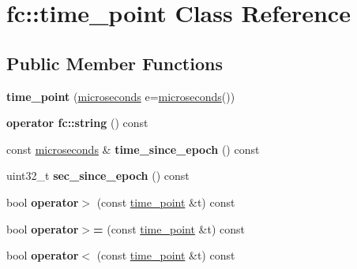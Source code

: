 \hypertarget{classfc_1_1time__point}{}\section{fc\+:\+:time\+\_\+point Class Reference}
\label{classfc_1_1time__point}
\subsection*{Public Member Functions}
\begin{DoxyCompactItemize}
\item 
\mbox{\label{classfc_1_1time__point_ada7b7d3ad6a93247eb2da29f193d0a3f}} 
{\bfseries time\+\_\+point} (\mbox{\hyperlink{classfc_1_1microseconds}{microseconds}} e=\mbox{\hyperlink{classfc_1_1microseconds}{microseconds}}())
\item 
\mbox{\label{classfc_1_1time__point_acf01edf36668a361a460192dd1765904}} 
{\bfseries operator fc\+::string} () const
\item 
\mbox{\label{classfc_1_1time__point_afade7a8da1b09194ef414d11fee9e5cd}} 
const \mbox{\hyperlink{classfc_1_1microseconds}{microseconds}} \& {\bfseries time\+\_\+since\+\_\+epoch} () const
\item 
\mbox{\label{classfc_1_1time__point_a46ab5dd7191bdc785f4f841e88c5fe44}} 
uint32\+\_\+t {\bfseries sec\+\_\+since\+\_\+epoch} () const
\item 
\mbox{\label{classfc_1_1time__point_a7703cda4b67e4f413bb30b9b50339ee1}} 
bool {\bfseries operator$>$} (const \mbox{\hyperlink{classfc_1_1time__point}{time\+\_\+point}} \&t) const
\item 
\mbox{\label{classfc_1_1time__point_a7f785a12a1941259887eda2d6f6f518a}} 
bool {\bfseries operator$>$=} (const \mbox{\hyperlink{classfc_1_1time__point}{time\+\_\+point}} \&t) const
\item 
\mbox{\label{classfc_1_1time__point_ab13056b8561d13e378baff1526839440}} 
bool {\bfseries operator$<$} (const \mbox{\hyperlink{classfc_1_1time__point}{time\+\_\+point}} \&t) const

\end{DoxyCompactItemize}
